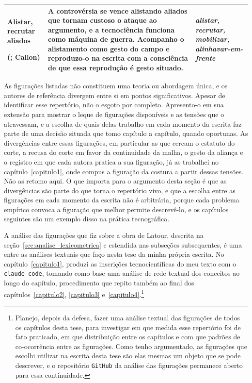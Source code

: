 \begin{longtable}{m{3.2cm} m{8.4cm} >{\itshape}m{2.4cm}}
    \hline
    \textbf{Alistar, recrutar aliados} \par (\textcite{Latour2011CienciaEmAcao}; Callon) & A controvérsia se vence alistando aliados que tornam custoso o ataque ao argumento, e a tecnociência funciona como máquina de guerra. Acompanho o alistamento como gesto do campo e reproduzo-o na escrita com a consciência de que essa reprodução é gesto situado. & alistar, recrutar, mobilizar, alinhavar-em-frente \\
    \hline
\end{longtable}

As figurações listadas não constituem uma teoria ou abordagem única, e os autores de referência divergem entre si em pontos significativos. Apesar de identificar esse repertório, não o esgoto por completo. Apresento-o em sua extensão para mostrar o leque de figurações disponíveis e as tensões que o atravessam, e a escolha de quais delas trabalho em cada momento da escrita faz parte de uma decisão situada que tomo capítulo a capítulo, quando oportunas. As divergências entre essas figurações, em particular as que cercam o estatuto do corte, a recusa do corte em favor da continuidade da malha, o gesto da aliança e o registro em que cada autora pratica a sua figuração, já as trabalhei no capítulo~\ref{capitulo1}, onde compus a figuração da costura a partir dessas tensões. Não as retomo aqui. O que importa para o argumento desta seção é que as divergências são parte do que torna o repertório vivo, e que a escolha entre as figurações em cada momento da escrita não é arbitrária, porque cada problema empírico convoca a figuração que melhor permite descrevê-lo, e os capítulos seguintes são um exemplo disso na prática tecnográfica.

A análise das figurações que fiz sobre a obra de Latour, descrita na seção~\ref{sec:analise_lexicometrica} e estendida nas subseções subsequentes, é uma entre as análises textuais que faço nesta tese da minha própria escrita. No capítulo~\ref{capitulo1}, produzi as inscrições tecnocientíficas do meu texto com o \texttt{claude code}, tomando como base uma análise de rede textual dos conceitos ao longo do capítulo, procedimento que repito também ao final dos capítulos~\ref{capitulo2}, \ref{capitulo3} e~\ref{capitulo4}.\footnote{Planejo, depois da defesa, fazer uma análise textual das figurações de todos os capítulos desta tese, para investigar em que medida esse repertório foi de fato praticado, em que distribuição entre os capítulos e com que padrões de co-ocorrência entre as figurações. Como tenho argumentado, as figurações que escolhi utilizar na escrita desta tese são elas mesmas um objeto que se pode descrever, e o repositório \texttt{GitHub} da análise das figurações permanece aberto para essa continuidade.}

